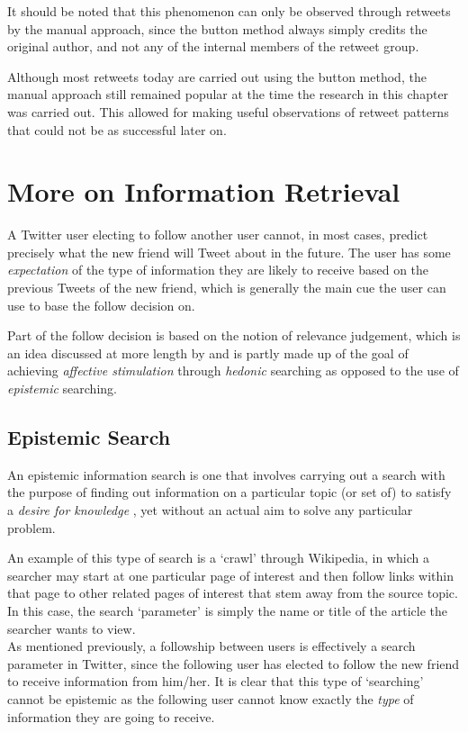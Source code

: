 It should be noted that this phenomenon can only be observed through retweets by the manual approach, since the button method always simply credits the original author, and not any of the internal members of the retweet group.

Although most retweets today are carried out using the button method, the manual approach still remained popular at the time the research in this chapter was carried out. This allowed for making useful observations of retweet patterns that could not be as successful later on.


\section{More on Information Retrieval}
A Twitter user electing to follow another user cannot, in most cases, predict precisely what the new friend will Tweet about in the future. The user has some \textit{expectation} of the type of information they are likely to receive based on the previous Tweets of the new friend, which is generally the main cue the user can use to base the follow decision on.

Part of the follow decision is based on the notion of relevance judgement, which is an idea discussed at more length by \cite{xu07} and is partly made up of the goal of achieving \textit{affective stimulation} through \textit{hedonic} searching as opposed to the use of \textit{epistemic} searching.

\subsection{Epistemic Search}
An epistemic information search is one that involves carrying out a search with the purpose of finding out information on a particular topic (or set of) to satisfy a \textit{desire for knowledge} \cite{xu07}, yet without an actual aim to solve any particular problem.

An example of this type of search is a `crawl' through Wikipedia, in which a searcher may start at one particular page of interest and then follow links within that page to other related pages of interest that stem away from the source topic. In this case, the search `parameter' is simply the name or title of the article the searcher wants to view.\\
As mentioned previously, a followship between users is effectively a search parameter in Twitter, since the following user has elected to follow the new friend to receive information from him/her. It is clear that this type of `searching' cannot be epistemic as the following user cannot know exactly the \textit{type} of information they are going to receive.

